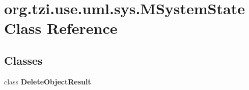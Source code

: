 \hypertarget{classorg_1_1tzi_1_1use_1_1uml_1_1sys_1_1_m_system_state}{\section{org.\-tzi.\-use.\-uml.\-sys.\-M\-System\-State Class Reference}
\label{classorg_1_1tzi_1_1use_1_1uml_1_1sys_1_1_m_system_state}
}
\subsection*{Classes}
\begin{DoxyCompactItemize}
\item 
class {\bfseries Delete\-Object\-Result}
\end{DoxyCompactItemize}
